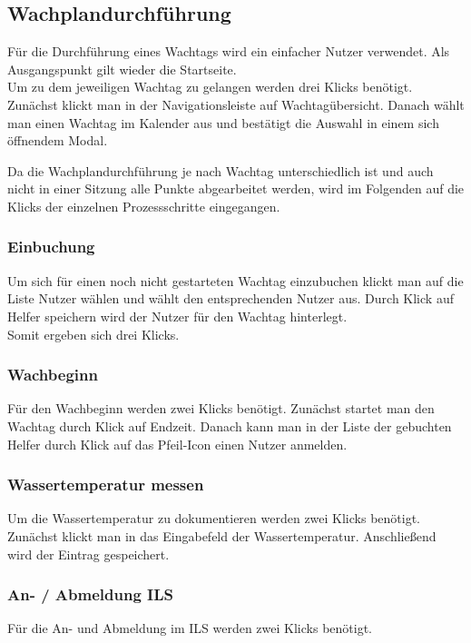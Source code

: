 \documentclass[fontsize=12pt,openright,oneside,paper=a4,BCOR=1cm]{scrbook}
\begin{document}
\subsection{Wachplandurchführung}
Für die Durchführung eines Wachtags wird ein einfacher Nutzer verwendet. Als Ausgangspunkt gilt wieder die Startseite. \\
Um zu dem jeweiligen Wachtag zu gelangen werden drei Klicks benötigt. Zunächst klickt man in der Navigationsleiste auf \glqq Wachtagübersicht\grqq{}. Danach wählt man einen Wachtag im Kalender aus und bestätigt die Auswahl in einem sich öffnendem Modal. 

Da die Wachplandurchführung je nach Wachtag unterschiedlich ist und auch nicht in einer Sitzung alle Punkte abgearbeitet werden, wird im Folgenden auf die Klicks der einzelnen Prozessschritte eingegangen.

\subsubsection{Einbuchung}
Um sich für einen noch nicht gestarteten Wachtag einzubuchen klickt man auf die Liste \glqq Nutzer wählen\grqq{} und wählt den entsprechenden Nutzer aus. Durch Klick auf \glqq Helfer speichern\grqq{} wird der Nutzer für den Wachtag hinterlegt. \\
Somit ergeben sich drei Klicks.

\subsubsection{Wachbeginn}
Für den Wachbeginn werden zwei Klicks benötigt. Zunächst startet man den Wachtag durch Klick auf \glqq Endzeit. Danach kann man in der Liste der gebuchten Helfer durch Klick auf das Pfeil-Icon einen Nutzer anmelden.

\subsubsection{Wassertemperatur messen}
Um die Wassertemperatur zu dokumentieren werden zwei Klicks benötigt. Zunächst klickt man in das Eingabefeld der Wassertemperatur. Anschließend wird der Eintrag gespeichert.

\subsubsection{An- / Abmeldung ILS}
Für die An- und Abmeldung im ILS werden zwei Klicks benötigt.
\end{document}
